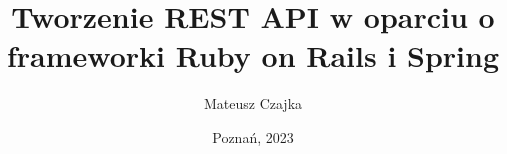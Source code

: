 \documentclass[12pt,a4paper,leqno,polish,oneside,msc]{dcsbook}
\begin{document}
\author{Mateusz Czajka}
\title{Tworzenie REST API w oparciu o frameworki Ruby on Rails i Spring}
\date{Poznań, 2023}
\maketitle
\frontmatter



\tableofcontents

\mainmatter





\appendix




\end{document}
